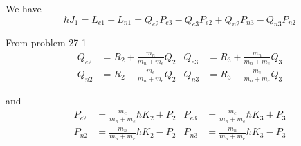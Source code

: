 


\bigskip
We have
\begin{equation*}
\hbar J_1=L_{e1}+L_{n1}=Q_{e2}P_{e3}-Q_{e3}P_{e2}+Q_{n2}P_{n3}-Q_{n3}P_{n2}
\end{equation*}

From problem 27-1
\begin{align*}
Q_{e2}&=R_2+\frac{m_n}{m_n+m_e}Q_2 & Q_{e3}&=R_3+\frac{m_n}{m_n+m_e}Q_3
\\
Q_{n2}&=R_2-\frac{m_e}{m_n+m_e}Q_2 & Q_{n3}&=R_3-\frac{m_e}{m_n+m_e}Q_3
\end{align*}

and
\begin{align*}
P_{e2}&=\frac{m_e}{m_n+m_e}\hbar K_2+P_2 & P_{e3}&=\frac{m_e}{m_n+m_e}\hbar K_3+P_3
\\
P_{n2}&=\frac{m_n}{m_n+m_e}\hbar K_2-P_2 & P_{n3}&=\frac{m_n}{m_n+m_e}\hbar K_3-P_3
\end{align*}


